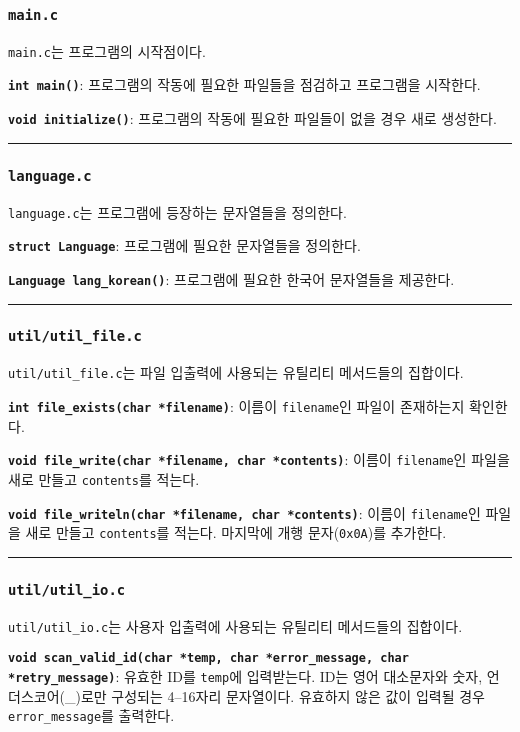 \documentclass[runningheads]{llncs}
\begin{document}
\subsubsection{\texttt{main.c}}
\texttt{main.c}는 프로그램의 시작점이다.

\textbf{\texttt{int main()}}: 프로그램의 작동에 필요한 파일들을 점검하고 프로그램을 시작한다.

\textbf{\texttt{void initialize()}}: 프로그램의 작동에 필요한 파일들이 없을 경우 새로 생성한다.

\noindent\rule{2cm}{0.4pt}

\subsubsection{\texttt{language.c}}
\texttt{language.c}는 프로그램에 등장하는 문자열들을 정의한다.

\textbf{\texttt{struct Language}}: 프로그램에 필요한 문자열들을 정의한다.

\textbf{\texttt{Language lang_korean()}}: 프로그램에 필요한 한국어 문자열들을 제공한다.

\noindent\rule{2cm}{0.4pt}

\subsubsection{\texttt{util/util_file.c}}
\texttt{util/util_file.c}는 파일 입출력에 사용되는 유틸리티 메서드들의 집합이다.

\textbf{\texttt{int file_exists(char *filename)}}: 이름이 \texttt{filename}인 파일이 존재하는지 확인한다.

\textbf{\texttt{void file_write(char *filename, char *contents)}}: 이름이 \texttt{filename}인 파일을 새로 만들고 \texttt{contents}를 적는다.

\textbf{\texttt{void file_writeln(char *filename, char *contents)}}: 이름이 \texttt{filename}인 파일을 새로 만들고 \texttt{contents}를 적는다. 마지막에 개행 문자(\texttt{0x0A})를 추가한다.

\noindent\rule{2cm}{0.4pt}

\subsubsection{\texttt{util/util_io.c}}
\texttt{util/util_io.c}는 사용자 입출력에 사용되는 유틸리티 메서드들의 집합이다.

\textbf{\texttt{void scan_valid_id(char *temp, char *error_message, char *retry_message)}}: 유효한 ID를 \texttt{temp}에 입력받는다. ID는 영어 대소문자와 숫자, 언더스코어(_)로만 구성되는 4--16자리 문자열이다. 유효하지 않은 값이 입력될 경우 \texttt{error_message}를 출력한다.
\end{document}
